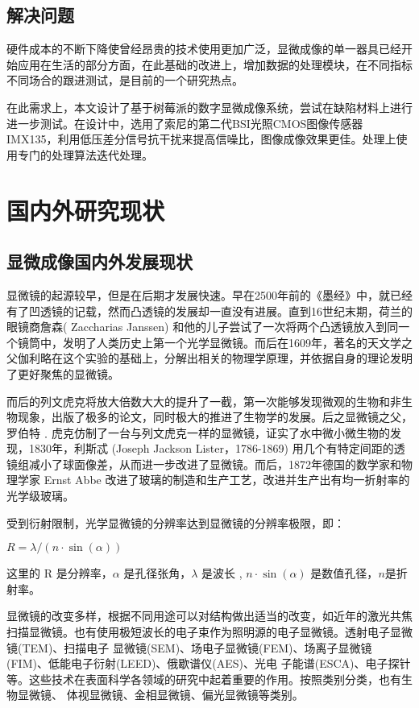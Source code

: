 \subsection{解决问题}
硬件成本的不断下降使曾经昂贵的技术使用更加广泛，显微成像的单一器具已经开始应用在生活的部分方面，在此基础的改进上，增加数据的处理模块，在不同指标不同场合的跟进测试，是目前的一个研究热点。

在此需求上，本文设计了基于树莓派的数字显微成像系统，尝试在缺陷材料上进行进一步测试。在设计中，选用了索尼的第二代BSI光照CMOS图像传感器IMX135，利用低压差分信号抗干扰来提高信噪比，图像成像效果更佳。处理上使用专门的处理算法迭代处理。


\section{国内外研究现状}
\subsection{显微成像国内外发展现状}
显微镜的起源较早，但是在后期才发展快速。早在2500年前的《墨经》中，就已经有了凹透镜的记载，然而凸透镜的发展却一直没有进展。直到16世纪末期，荷兰的眼镜商詹森( Zaccharias Janssen) 和他的儿子尝试了一次将两个凸透镜放入到同一个镜筒中，发明了人类历史上第一个光学显微镜。而后在1609年，著名的天文学之父伽利略在这个实验的基础上，分解出相关的物理学原理，并依据自身的理论发明了更好聚焦的显微镜。

而后的列文虎克将放大倍数大大的提升了一截，第一次能够发现微观的生物和非生物现象，出版了极多的论文，同时极大的推进了生物学的发展。后之显微镜之父，罗伯特﹒虎克仿制了一台与列文虎克一样的显微镜，证实了水中微小微生物的发现，1830年，利斯忒 (Joseph Jackson Lister，1786-1869) 用几个有特定间距的透镜组减小了球面像差，从而进一步改进了显微镜。而后，1872年德国的数学家和物理学家 Ernst Abbe 改进了玻璃的制造和生产工艺，改进并生产出有均一折射率的光学级玻璃。\cite{microimaging}\cite{microimagingelc}

受到衍射限制，光学显微镜的分辨率达到显微镜的分辨率极限，即：
\begin{center}
	$ R = \lambda/(n \cdot \sin(\alpha)) $ 
\end{center}
这里的 R 是分辨率，$\alpha$ 是孔径张角，$\lambda$ 是波长 , $n\cdot\sin(\alpha)$ 是数值孔径，$n$是折射率。 
	
显微镜的改变多样，根据不同用途可以对结构做出适当的改变，如近年的激光共焦扫描显微镜。也有使用极短波长的电子束作为照明源的电子显微镜。透射电子显微镜(TEM)、扫描电子
显微镜(SEM)、场电子显微镜(FEM)、场离子显微镜(FIM)、低能电子衍射(LEED)、俄歇谱仪(AES)、光电
子能谱(ESCA)、电子探针等。这些技术在表面科学各领域的研究中起着重要的作用\cite{xianwei}。按照类别分类，也有生物显微镜、
体视显微镜、金相显微镜、偏光显微镜等类别。

